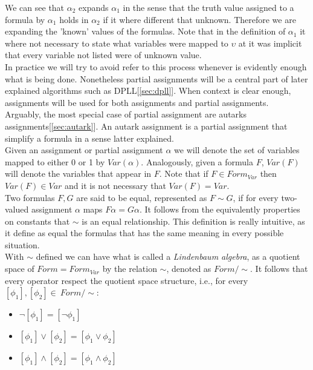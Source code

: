 We can see that $\alpha_2$ expands $\alpha_1$ in the sense that the truth value assigned to a formula by $\alpha_1$ holds in $\alpha_2$ if it where different that unknown. Therefore we are expanding the 'known' values of the formulas. Note that in the definition of $\alpha_1$ it where not necessary to state what variables were mapped to $\upsilon$ at it was implicit that every variable not listed were of unknown  value.\\

In practice we will try to avoid refer to this process whenever is evidently enough what is being done. Nonetheless partial assignments will be a central part of later explained algorithms such as DPLL[\ref{sec:dpll}]. When context is clear enough, assignments will be used for both assignments and partial assignments.\\

Arguably, the most special case of partial assignment are autarks assignments[\ref{sec:autark}]. An autark assignment is a partial assignment that simplify a formula in a sense latter explained.\\

Given an assignment or partial assignment $\alpha$ we will denote the set of variables mapped to either 0 or 1 by $Var(\alpha)$. Analogously, given a formula $F$, $Var(F)$ will denote the variables that appear in $F$. Note that if $F\in Form_{Var}$ then $Var(F)\in Var$ and it is not necessary that $Var(F)=Var$.\\


Two formulas $F,G$ are said to be equal, represented as $F\sim G$, if for every two-valued assignment $\alpha$ maps $F\alpha = G\alpha$. It follows from the equivalently properties on constants that $\sim$ is an equal relationship. This definition is really intuitive, as it define as equal the formulas that has the same meaning in every possible situation. \\



\label{def:linden}
With $\sim$ defined we can have what is called a \emph{Lindenbaum algebra}, as a quotient space of $Form = Form_{Var}$ by the relation $\sim$, denoted as $Form/\sim$. It follows that every operator respect the quotient space structure, i.e., for every $[\phi_1],[\phi_2]\in\ Form/\sim$:

\begin{itemize}
\item $\neg [\phi_1] = [\neg\phi_1]$
\item $ [\phi_1] \vee [\phi_2]= [\phi_1 \vee \phi_2]$
\item $ [\phi_1] \wedge [\phi_2]= [\phi_1 \wedge \phi_2]$
\end{itemize}

